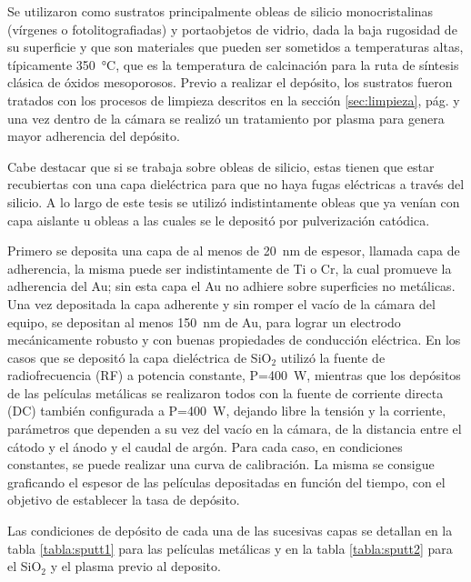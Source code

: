 			Se utilizaron como sustratos principalmente obleas de silicio monocristalinas (vírgenes o fotolitografiadas) y portaobjetos de vidrio, dada la baja rugosidad de su superficie y que son materiales que pueden ser sometidos a temperaturas altas, típicamente \SI{350}{\celsius}, que es la temperatura de calcinación para la ruta de síntesis clásica de óxidos mesoporosos. Previo a realizar el depósito, los sustratos fueron tratados con los procesos de limpieza descritos en la sección \ref{sec:limpieza}, pág. \pageref{sec:limpieza} y una vez dentro de la cámara se realizó un tratamiento por plasma para genera mayor adherencia del depósito. 

			Cabe destacar que si se trabaja sobre obleas de silicio, estas tienen que estar recubiertas con una capa dieléctrica para que no haya fugas eléctricas a través del silicio. A lo largo de este tesis se utilizó indistintamente obleas que ya venían con capa aislante u obleas a las cuales se le depositó por pulverización catódica. 	

			Primero se deposita una capa de al menos de \SI{20}{\nm} de espesor, llamada capa de  adherencia, la misma puede ser indistintamente de Ti o Cr, la cual promueve la adherencia del Au; sin esta capa el Au no adhiere sobre superficies no metálicas\cite{Hieber1976}. Una vez depositada la capa adherente y sin romper el vacío de la cámara del equipo, se depositan al menos \SI{150}{\nm} de Au, para lograr un electrodo mecánicamente robusto y con buenas propiedades de conducción eléctrica. En los casos que se depositó la capa dieléctrica de SiO$_2$ utilizó la fuente de radiofrecuencia (RF) a potencia constante, P=\SI{400}{W}, mientras que los depósitos de las películas metálicas se realizaron todos con la fuente de corriente directa (DC) también configurada a P=\SI{400}{W}, dejando libre la tensión y la corriente, parámetros que dependen a su vez del vacío en la cámara, de la distancia entre el cátodo y el ánodo y el caudal de argón. Para cada caso, en condiciones constantes, se puede realizar una curva de calibración. La misma se consigue graficando el espesor de las películas depositadas en función del tiempo, con el objetivo de establecer la tasa de depósito. 

			Las condiciones de depósito de cada una de las sucesivas capas se detallan en la tabla \ref{tabla:sputt1} para las películas metálicas y en la tabla  \ref{tabla:sputt2} para el SiO$_2$ y el plasma previo al deposito.

